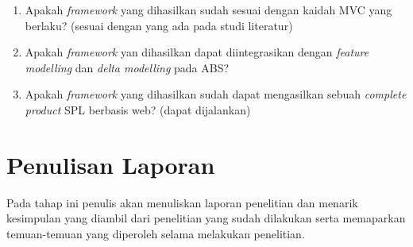 \begin{enumerate}
    \item Apakah \textit{framework} yang dihasilkan sudah sesuai dengan kaidah MVC yang berlaku? (sesuai dengan yang ada pada studi literatur)
    \item Apakah \textit{framework} yan dihasilkan dapat diintegrasikan dengan \textit{feature modelling} dan \textit{delta modelling} pada ABS?
    \item Apakah \textit{framework} yang dihasilkan sudah dapat mengasilkan sebuah \textit{complete product} SPL berbasis web? (dapat dijalankan)
\end{enumerate}

\section{Penulisan Laporan}

Pada tahap ini penulis akan menuliskan laporan penelitian dan menarik kesimpulan yang diambil dari penelitian yang sudah dilakukan serta memaparkan temuan-temuan yang diperoleh selama melakukan penelitian.